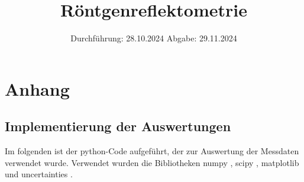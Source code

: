 

\subject{v44}
\title{Röntgenreflektometrie}
\date{%
  Durchführung: 28.10.2024
  \hspace{3em}
  Abgabe: 29.11.2024
}



\maketitle
\thispagestyle{empty}
\tableofcontents
\newpage

\DeclareSIUnit{}







\printbibliography{}

\appendix
\newpage

\section{Anhang}
\label{sec:Anhang}
\subsection{Implementierung der Auswertungen}
Im folgenden ist der python-Code aufgeführt, der zur Auswertung der Messdaten verwendet wurde.
Verwendet wurden die Bibliotheken numpy \cite{numpy}, scipy \cite{scipy}, matplotlib \cite{matplotlib} und uncertainties \cite{uncertainties}.

% 



